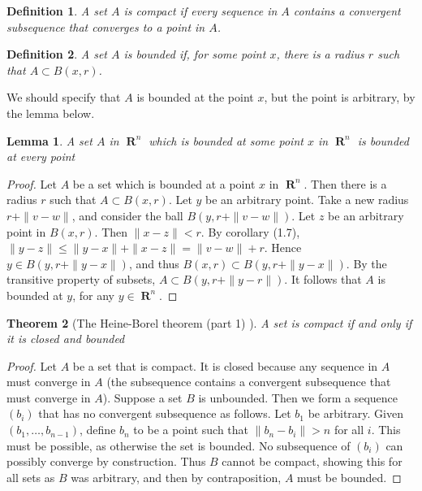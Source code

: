 \documentclass{report}
\newtheorem{theorem}{Theorem}[chapter]
\newtheorem{lemma}[theorem]{Lemma}
\newtheorem{definition}{Definition}
\DeclareMathOperator{\real}{\mathbf{R}}
\begin{document}
\begin{definition}
  A set $A$ is compact if every sequence in $A$ contains a convergent subsequence that converges to a point in $A$.
\end{definition}

\begin{definition}
  A set $A$ is bounded if, for some point $x$, there is a radius $r$ such that $A \subset B(x,r)$.
\end{definition}

We should specify that $A$ is bounded at the point $x$, but the point is arbitrary, by the lemma below.

\begin{lemma}
  A set $A$ in $\real^n$ which is bounded at some point $x$ in $\real^n$ is bounded at every point
\end{lemma}
\begin{proof}
  Let $A$ be a set which is bounded at a point $x$ in $\real^n$. Then there is a radius $r$ such that $A \subset B(x,r)$. Let $y$ be an arbitrary point. Take a new radius $r + \| v - w \|$, and consider the ball $B(y,r + \| v - w \|)$. Let $z$ be an arbitrary point in $B(x,r)$. Then $\| x - z \| < r$. By corollary (1.7), $\| y - z \| \leq \| y - x \| + \| x - z \| = \| v - w \| + r$. Hence $y \in B(y,r + \|y - x\|)$, and thus $B(x,r) \subset B(y,r + \|y - x\|)$. By the transitive property of subsets, $A \subset B(y,r + \|y - r\|)$. It follows that $A$ is bounded at $y$, for any $y \in \real^n$.
\end{proof}

\begin{theorem}[The Heine-Borel theorem (part 1) ]
  A set is compact if and only if it is closed and bounded
\end{theorem}
\begin{proof}
  Let $A$ be a set that is compact. It is closed because any sequence in $A$ must converge in $A$ (the subsequence contains a convergent subsequence that must converge in $A$). Suppose a set $B$ is unbounded. Then we form a sequence $(b_i)$ that has no convergent subsequence as follows. Let $b_1$ be arbitrary. Given $(b_1, \dots, b_{n-1})$, define $b_n$ to be a point such that $\| b_n - b_i \| > n$ for all $i$. This must be possible, as otherwise the set is bounded. No subsequence of $(b_i)$ can possibly converge by construction. Thus $B$ cannot be compact, showing this for all sets as $B$ was arbitrary, and then by contraposition, $A$ must be bounded.
\end{proof}
\end{document}

